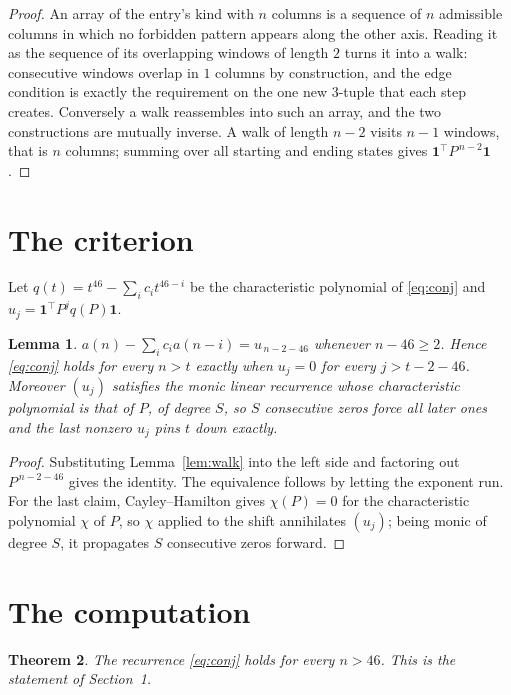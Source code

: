 \documentclass[11pt,a4paper]{article}
\theoremstyle{plain}
\newtheorem{theorem}{Theorem}
\newtheorem{lemma}[theorem]{Lemma}
\theoremstyle{definition}
\begin{document}
\begin{proof}
An array of the entry's kind with $n$ columns is a sequence of $n$ admissible columns in
which no forbidden pattern appears along the other axis. Reading it as the sequence of its
overlapping windows of length $2$ turns it into a walk: consecutive windows overlap in
$1$ columns by construction, and the edge condition is exactly the requirement on the one
new $3$-tuple that each step creates. Conversely a walk reassembles into such an array,
and the two constructions are mutually inverse. A walk of length $n-2$ visits $n-1$
windows, that is $n$ columns; summing over all starting and ending states gives
$\mathbf{1}^{\!\top}P^{\,n-2}\mathbf{1}$.
\end{proof}

\section{The criterion}

Let $q(t)=t^{46}-\sum_i c_i t^{46-i}$ be the characteristic polynomial of
\eqref{eq:conj} and $u_j=\mathbf{1}^{\!\top}P^{j}q(P)\mathbf{1}$.

\begin{lemma}\label{lem:crit}
$a(n)-\sum_i c_i a(n-i)=u_{\,n-2-46}$ whenever $n-46\ge2$. Hence
\eqref{eq:conj} holds for every $n>t$ exactly when $u_j=0$ for every
$j>t-2-46$. Moreover $(u_j)$ satisfies the monic linear recurrence whose
characteristic polynomial is that of $P$, of degree $S$, so $S$ consecutive zeros force all
later ones and the last nonzero $u_j$ pins $t$ down exactly.
\end{lemma}

\begin{proof}
Substituting Lemma~\ref{lem:walk} into the left side and factoring out
$P^{\,n-2-46}$ gives the identity. The equivalence follows by letting the exponent
run. For the last claim, Cayley--Hamilton gives $\chi(P)=0$ for the characteristic
polynomial $\chi$ of $P$, so $\chi$ applied to the shift annihilates $(u_j)$; being monic of
degree $S$, it propagates $S$ consecutive zeros forward.
\end{proof}

\section{The computation}

\begin{theorem}
The recurrence \eqref{eq:conj} holds for every $n>46$. This is the statement of
Section~1.
\end{theorem}
\end{document}
